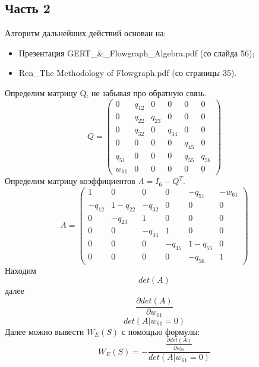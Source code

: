 \subsection{Часть 2}
Алгоритм дальнейших действий основан на:
\begin{itemize}
\item Презентация GERT\_\&\_Flowgraph\_Algebra.pdf (со слайда 56);
\item Ren\_The Methodology of Flowgraph.pdf (со страницы 35).
\end{itemize}
Определим матрицу Q, не забывая про обратную связь.
\begin{equation*}
Q = 
 \begin{pmatrix}
  0 & q_{12} & 0 & 0 & 0 & 0 \\
  0 & q_{22} & q_{23} & 0 & 0 & 0 \\ 
  0 & q_{32} & 0 & q_{34} & 0 & 0 \\ 
  0 & 0 & 0 & 0 & q_{45} & 0 \\ 
  q_{51} & 0 & 0 & 0 & q_{55} & q_{56} \\ 
  w_{61} & 0 & 0 & 0 & 0 & 0 
 \end{pmatrix}
\end{equation*}
Определим матрицу коэффициентов $A=I_6-Q^T$.
\begin{equation*}
A = 
 \begin{pmatrix}
    1&       0&    0&    0&    -q_{51}& -w_{61}\\
 -q_{12}& 1 - q_{22}& -q_{32}&    0&       0&    0\\
    0&    -q_{23}&    1&    0&       0&    0\\
    0&       0& -q_{34}&    1&       0&    0\\
    0&       0&    0& -q_{45}& 1 - q_{55}&    0\\
    0&       0&    0&    0&    -q_{56}&    1
 \end{pmatrix}
\end{equation*}
Находим 
\begin{equation*}
det(A)
\end{equation*}
далее
\begin{equation*}
\frac{\partial det(A)}{\partial w_{61}}
\end{equation*}
\begin{equation*}
det(A | w_{61}=0)
\end{equation*}
Далее можно вывести $W_E(S)$ с помощью формулы:
\begin{equation*}
W_E(S)=-\frac{\frac{\partial det(A)}{\partial w_{61}}}{det(A | w_{61}=0)}
\end{equation*}
